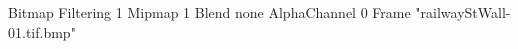 {Bitmap
	{Filtering 1}
	{Mipmap 1}
	{Blend none}
	{AlphaChannel 0}
	{Frame "railwayStWall-01.tif.bmp"}
}
